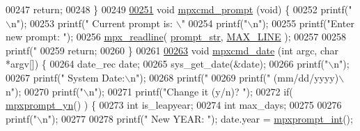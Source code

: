\begin{DoxyCode}
{{{{{{{{{{{{00247         \textcolor{keywordflow}{return};
00248 \}
00249 
\hypertarget{_m_p_x___c_m_d_8_c_source_l00251}{}\hyperlink{mpx__cmd_8h_a0a04805761cf7c183609e1383a4c4975}{00251} \textcolor{keywordtype}{void} \hyperlink{_m_p_x___c_m_d_8_c_a0a04805761cf7c183609e1383a4c4975}{mpxcmd_prompt} (\textcolor{keywordtype}{void}) \{
00252         printf(\textcolor{stringliteral}{"\(\backslash\)n"});
00253         printf(\textcolor{stringliteral}{"  Current prompt is: \(\backslash\)"%
00254         printf(\textcolor{stringliteral}{"\(\backslash\)n"});
00255         printf(\textcolor{stringliteral}{"Enter new prompt: "});
00256         \hyperlink{mpx__util_8c_a781169ab05ad54c0d37253d73060b77f}{mpx_readline}( \hyperlink{_m_p_x___c_m_d_8_c_a4d455760d7d89fa6a1c1559f7b6acdf7}{prompt_str}, \hyperlink{mpx__cmd_8h_a842ed03f27719bc87666bfd1f75415b8}{MAX_LINE} );
00257 
00258         printf(\textcolor{stringliteral}{"%
00259         \textcolor{keywordflow}{return};
00260 \}
00261 
\hypertarget{_m_p_x___c_m_d_8_c_source_l00263}{}\hyperlink{mpx__cmd_8h_a8959742dda38733f33da60a56cb07373}{00263} \textcolor{keywordtype}{void} \hyperlink{_m_p_x___c_m_d_8_c_a8959742dda38733f33da60a56cb07373}{mpxcmd_date} (\textcolor{keywordtype}{int} argc, \textcolor{keywordtype}{char} *argv[]) \{
00264         date\_rec date;
00265         sys\_get\_date(&date);
00266         printf(\textcolor{stringliteral}{"\(\backslash\)n"});
00267         printf(\textcolor{stringliteral}{"  System Date:\(\backslash\)n"});
00268         printf(\textcolor{stringliteral}{"    %
00269         printf(\textcolor{stringliteral}{"   (mm/dd/yyyy)\(\backslash\)n"});
00270         printf(\textcolor{stringliteral}{"\(\backslash\)n"});
00271         printf(\textcolor{stringliteral}{"Change it (y/n)? "});
00272         \textcolor{keywordflow}{if}( \hyperlink{mpx__util_8c_a8e31250a20e8bc8e7106f5a37c391199}{mpxprompt_yn}() ) \{
00273                 \textcolor{keywordtype}{int} is\_leapyear;
00274                 \textcolor{keywordtype}{int} max\_days;
00275 
00276                 printf(\textcolor{stringliteral}{"\(\backslash\)n"});
00277 
00278                 printf(\textcolor{stringliteral}{"  New YEAR:  "}); date.year      = \hyperlink{mpx__util_8c_aacc3dfe470919b0bd1133bce90383e18}{mpxprompt_int}();
}}}}}}}}}}}}}}}
\end{DoxyCode}

